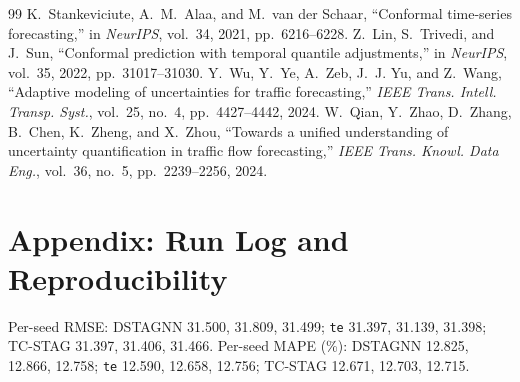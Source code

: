 \documentclass[conference]{IEEEtran}
\begin{document}
\begin{thebibliography}{99}
 K.~Stankeviciute, A.~M.~Alaa, and M.~van der Schaar, ``Conformal time-series forecasting,'' in \emph{NeurIPS}, vol.~34, 2021, pp.~6216--6228.
 Z.~Lin, S.~Trivedi, and J.~Sun, ``Conformal prediction with temporal quantile adjustments,'' in \emph{NeurIPS}, vol.~35, 2022, pp.~31017--31030.
 Y.~Wu, Y.~Ye, A.~Zeb, J.~J. Yu, and Z.~Wang, ``Adaptive modeling of uncertainties for traffic forecasting,'' \emph{IEEE Trans. Intell. Transp. Syst.}, vol.~25, no.~4, pp.~4427--4442, 2024.
 W.~Qian, Y.~Zhao, D.~Zhang, B.~Chen, K.~Zheng, and X.~Zhou, ``Towards a unified understanding of uncertainty quantification in traffic flow forecasting,'' \emph{IEEE Trans. Knowl. Data Eng.}, vol.~36, no.~5, pp.~2239--2256, 2024.
\end{thebibliography}

\appendix
\section*{Appendix: Run Log and Reproducibility}
\begin{table}[h]
\centering\caption{Run log (Kaggle NVIDIA T4 GPUs). Seconds per epoch, best epoch and test MAE per seed.}\label{tab:runlog}
\footnotesize
{}
\end{table}
Per-seed RMSE: DSTAGNN 31.500, 31.809, 31.499; \texttt{te} 31.397, 31.139, 31.398; TC-STAG 31.397, 31.406, 31.466. Per-seed MAPE (\%): DSTAGNN 12.825, 12.866, 12.758; \texttt{te} 12.590, 12.658, 12.756; TC-STAG 12.671, 12.703, 12.715.
\end{document}
